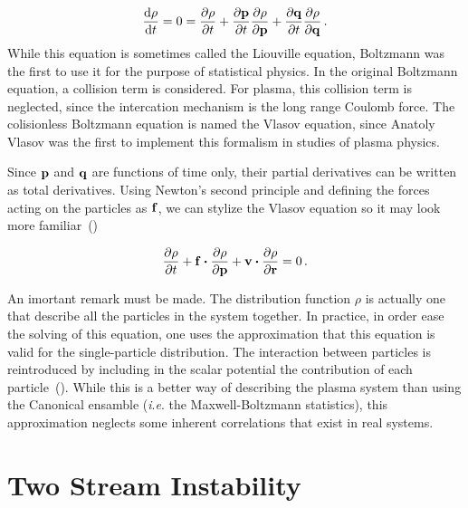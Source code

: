 \documentclass[12pt, class=report, crop=false]{standalone}
\begin{document}
\begin{equation}
  \dv{\rho}{t} = 0 = \pdv{\rho}{t} + \pdv{\vb{p}}{t} \pdv{\rho}{\vb{p}} + \pdv{\vb{q}}{t} \pdv{\rho}{\vb{q}} \,.
\end{equation}
While this equation is sometimes called the Liouville equation, Boltzmann was the first to use it for the purpose of statistical physics. In the original Boltzmann equation, a collision term is considered. For plasma, this collision term is neglected, since the intercation mechanism is the long range Coulomb force. The colisionless Boltzmann equation is named the Vlasov equation, since Anatoly Vlasov was the first to implement this formalism in studies of plasma physics.

Since \(\vb{p}\) and \(\vb{q}\) are functions of time only, their partial derivatives can be written as total derivatives. Using Newton's second principle and defining the forces acting on the particles as \(\vb{f}\), we can stylize the Vlasov equation so it may look more familiar~(\cite{feixUniversalModelVlasov2005})

\begin{equation}
  \pdv{\rho}{t} + \vb{f}\vdot\pdv{\rho}{\vb{p}} + \vb{v}\vdot\pdv{\rho}{\vb{r}} = 0\,.
\end{equation}

An imortant remark must be made. The distribution function \(\rho\) is actually one that describe all the particles in the system together. In practice, in order ease the solving of this equation, one uses the approximation that this equation is valid for the single-particle distribution. The interaction between particles is reintroduced by including in the scalar potential the contribution of each particle~(\cite{silimVlasovcodeSimulationsCollisionless2003}). While this is a better way of describing the plasma system than using the Canonical ensamble (\textit{i}.\textit{e}. the Maxwell-Boltzmann statistics), this approximation neglects some inherent correlations that exist in real systems.

\section{Two Stream Instability}
\end{document}
